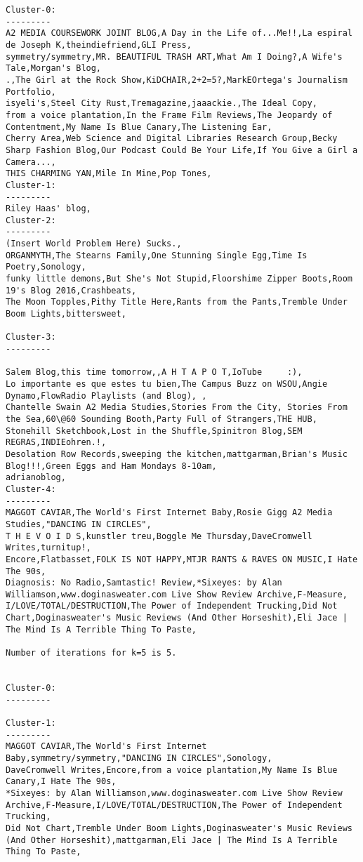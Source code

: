 \begin{lstlisting}[style=nonumbers, keywords={select, from, where, limit, and}]
Cluster-0:
---------
A2 MEDIA COURSEWORK JOINT BLOG,A Day in the Life of...Me!!,La espiral de Joseph K,theindiefriend,GLI Press,
symmetry/symmetry,MR. BEAUTIFUL TRASH ART,What Am I Doing?,A Wife's Tale,Morgan's Blog,
.,The Girl at the Rock Show,KiDCHAIR,2+2=5?,MarkEOrtega's Journalism Portfolio,
isyeli's,Steel City Rust,Tremagazine,jaaackie.,The Ideal Copy,
from a voice plantation,In the Frame Film Reviews,The Jeopardy of Contentment,My Name Is Blue Canary,The Listening Ear,
Cherry Area,Web Science and Digital Libraries Research Group,Becky Sharp Fashion Blog,Our Podcast Could Be Your Life,If You Give a Girl a Camera...,
THIS CHARMING YAN,Mile In Mine,Pop Tones,
Cluster-1:
---------
Riley Haas' blog,
Cluster-2:
---------
(Insert World Problem Here) Sucks.,
ORGANMYTH,The Stearns Family,One Stunning Single Egg,Time Is Poetry,Sonology,
funky little demons,But She's Not Stupid,Floorshime Zipper Boots,Room 19's Blog 2016,Crashbeats,
The Moon Topples,Pithy Title Here,Rants from the Pants,Tremble Under Boom Lights,bittersweet,

Cluster-3:
---------

Salem Blog,this time tomorrow,,A H T A P O T,IoTube     :),
Lo importante es que estes tu bien,The Campus Buzz on WSOU,Angie Dynamo,FlowRadio Playlists (and Blog), ,
Chantelle Swain A2 Media Studies,Stories From the City, Stories From the Sea,60\@60 Sounding Booth,Party Full of Strangers,THE HUB,
Stonehill Sketchbook,Lost in the Shuffle,Spinitron Blog,SEM REGRAS,INDIEohren.!,
Desolation Row Records,sweeping the kitchen,mattgarman,Brian's Music Blog!!!,Green Eggs and Ham Mondays 8-10am,
adrianoblog,
Cluster-4:
---------
MAGGOT CAVIAR,The World's First Internet Baby,Rosie Gigg A2 Media Studies,"DANCING IN CIRCLES",
T H E V O I D S,kunstler treu,Boggle Me Thursday,DaveCromwell Writes,turnitup!,
Encore,Flatbasset,FOLK IS NOT HAPPY,MTJR RANTS & RAVES ON MUSIC,I Hate The 90s,
Diagnosis: No Radio,Samtastic! Review,*Sixeyes: by Alan Williamson,www.doginasweater.com Live Show Review Archive,F-Measure,
I/LOVE/TOTAL/DESTRUCTION,The Power of Independent Trucking,Did Not Chart,Doginasweater's Music Reviews (And Other Horseshit),Eli Jace | The Mind Is A Terrible Thing To Paste,

Number of iterations for k=5 is 5.


Cluster-0:
---------

Cluster-1:
---------
MAGGOT CAVIAR,The World's First Internet Baby,symmetry/symmetry,"DANCING IN CIRCLES",Sonology,
DaveCromwell Writes,Encore,from a voice plantation,My Name Is Blue Canary,I Hate The 90s,
*Sixeyes: by Alan Williamson,www.doginasweater.com Live Show Review Archive,F-Measure,I/LOVE/TOTAL/DESTRUCTION,The Power of Independent Trucking,
Did Not Chart,Tremble Under Boom Lights,Doginasweater's Music Reviews (And Other Horseshit),mattgarman,Eli Jace | The Mind Is A Terrible Thing To Paste,


\end{lstlisting}
